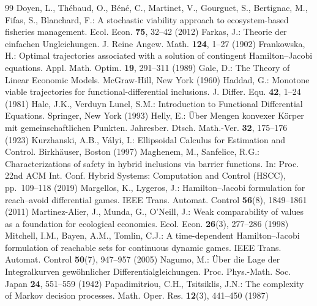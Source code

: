 \begin{thebibliography}{99}
 Doyen, L., Th\'ebaud, O., B\'en\'e, C., Martinet, V., Gourguet, S., Bertignac, M., Fifas, S., Blanchard, F.: A stochastic viability approach to ecosystem-based fisheries management. Ecol. Econ. \textbf{75}, 32--42 (2012)
 Farkas, J.: Theorie der einfachen Ungleichungen. J. Reine Angew. Math. \textbf{124}, 1--27 (1902)
 Frankowska, H.: Optimal trajectories associated with a solution of contingent Hamilton--Jacobi equations. Appl. Math. Optim. \textbf{19}, 291--311 (1989)
 Gale, D.: The Theory of Linear Economic Models. McGraw-Hill, New York (1960)
 Haddad, G.: Monotone viable trajectories for functional-differential inclusions. J. Differ. Equ. \textbf{42}, 1--24 (1981)
 Hale, J.K., Verduyn Lunel, S.M.: Introduction to Functional Differential Equations. Springer, New York (1993)
 Helly, E.: \"Uber Mengen konvexer K\"orper mit gemeinschaftlichen Punkten. Jahresber. Dtsch. Math.-Ver. \textbf{32}, 175--176 (1923)
 Kurzhanski, A.B., V\'alyi, I.: Ellipsoidal Calculus for Estimation and Control. Birkh\"auser, Boston (1997)
 Maghenem, M., Sanfelice, R.G.: Characterizations of safety in hybrid inclusions via barrier functions. In: Proc. 22nd ACM Int. Conf. Hybrid Systems: Computation and Control (HSCC), pp.~109--118 (2019)
 Margellos, K., Lygeros, J.: Hamilton--Jacobi formulation for reach--avoid differential games. IEEE Trans. Automat. Control \textbf{56}(8), 1849--1861 (2011)
 Martinez-Alier, J., Munda, G., O'Neill, J.: Weak comparability of values as a foundation for ecological economics. Ecol. Econ. \textbf{26}(3), 277--286 (1998)
 Mitchell, I.M., Bayen, A.M., Tomlin, C.J.: A time-dependent Hamilton--Jacobi formulation of reachable sets for continuous dynamic games. IEEE Trans. Automat. Control \textbf{50}(7), 947--957 (2005)
 Nagumo, M.: \"Uber die Lage der Integralkurven gew\"ohnlicher Differentialgleichungen. Proc. Phys.-Math. Soc. Japan \textbf{24}, 551--559 (1942)
 Papadimitriou, C.H., Tsitsiklis, J.N.: The complexity of Markov decision processes. Math. Oper. Res. \textbf{12}(3), 441--450 (1987)

\end{thebibliography}
